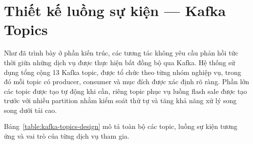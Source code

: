 \documentclass[../DoAn.tex]{subfiles}
\begin{document}
{%


\section{Thiết kế luồng sự kiện --- Kafka Topics}
\label{section:4.7}

Như đã trình bày ở phần kiến trúc, các tương tác không yêu cầu phản hồi tức thời giữa những
dịch vụ được thực hiện bất đồng bộ qua Kafka. Hệ thống sử dụng tổng cộng 13 Kafka topic, được
tổ chức theo từng nhóm nghiệp vụ, trong đó mỗi topic có producer, consumer và mục đích được
xác định rõ ràng. Phần lớn các topic được tạo tự động khi cần, riêng topic phục vụ luồng flash
sale được tạo trước với nhiều partition nhằm kiểm soát thứ tự và tăng khả năng xử lý song song
dưới tải cao.

Bảng~\ref{table:kafka-topics-design} mô tả toàn bộ các topic, luồng sự kiện tương ứng và vai
trò của từng dịch vụ tham gia.

}
\end{document}
